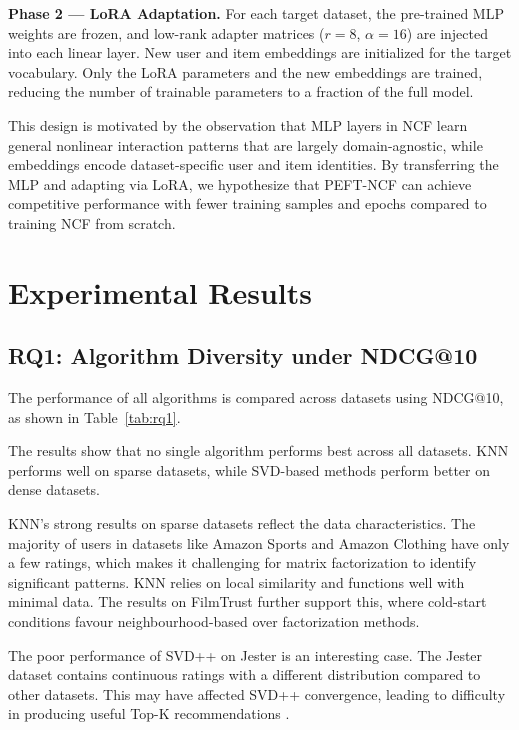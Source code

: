 \documentclass[conference]{IEEEtran}
\begin{document}
\textbf{Phase 2 --- LoRA Adaptation.} For each target dataset, the pre-trained MLP weights are frozen, and low-rank adapter matrices ($r = 8$, $\alpha = 16$) are injected into each linear layer. New user and item embeddings are initialized for the target vocabulary. Only the LoRA parameters and the new embeddings are trained, reducing the number of trainable parameters to a fraction of the full model.

This design is motivated by the observation that MLP layers in NCF learn general nonlinear interaction patterns that are largely domain-agnostic, while embeddings encode dataset-specific user and item identities. By transferring the MLP and adapting via LoRA, we hypothesize that PEFT-NCF can achieve competitive performance with fewer training samples and epochs compared to training NCF from scratch.

\section{Experimental Results}

\subsection{RQ1: Algorithm Diversity under NDCG@10}

The performance of all algorithms is compared across datasets using NDCG@10, as shown in Table~\ref{tab:rq1}.



The results show that no single algorithm performs best across all datasets. KNN performs well on sparse datasets, while SVD-based methods perform better on dense datasets.

KNN's strong results on sparse datasets reflect the data characteristics. The majority of users in datasets like Amazon Sports and Amazon Clothing have only a few ratings, which makes it challenging for matrix factorization to identify significant patterns. KNN relies on local similarity and functions well with minimal data. The results on FilmTrust further support this, where cold-start conditions favour neighbourhood-based over factorization methods.

The poor performance of SVD++ on Jester is an interesting case. The Jester dataset contains continuous ratings with a different distribution compared to other datasets. This may have affected SVD++ convergence, leading to difficulty in producing useful Top-K recommendations \cite{koren2008factorization}.
\end{document}
